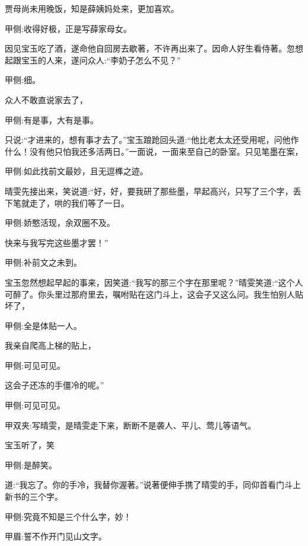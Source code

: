 \begin{parag}
    贾母尚未用晚饭，知是薛姨妈处来，更加喜欢。\begin{note}甲侧:收得好极，正是写薛家母女。\end{note}因见宝玉吃了酒，遂命他自回房去歇著，不许再出来了。因命人好生看侍著。忽想起跟宝玉的人来，遂问众人:“李奶子怎么不见？”\begin{note}甲侧:细。\end{note}众人不敢直说家去了，\begin{note}甲侧:有是事，大有是事。\end{note}只说:“才进来的，想有事才去了。”宝玉踉跄回头道:“他比老太太还受用呢，问他作什么！没有他只怕我还多活两日。”一面说，一面来至自己的卧室。只见笔墨在案，\begin{note}甲侧:如此找前文最妙，且无逗榫之迹。\end{note}晴雯先接出来，笑说道:“好，好，要我研了那些墨，早起高兴，只写了三个字，丢下笔就走了，哄的我们等了一日。\begin{note}甲侧:娇憨活现，余双圈不及。\end{note}快来与我写完这些墨才罢！”\begin{note}甲侧:补前文之未到。\end{note}宝玉忽然想起早起的事来，因笑道:“我写的那三个字在那里呢？”晴雯笑道:“这个人可醉了。你头里过那府里去，嘱咐贴在这门斗上，这会子又这么问。我生怕别人贴坏了，\begin{note}甲侧:全是体贴一人。\end{note}我亲自爬高上梯的贴上，\begin{note}甲侧:可见可见。\end{note}这会子还冻的手僵冷的呢。”\begin{note}甲侧:可见可见。\end{note}\begin{note}甲双夹:写晴雯，是晴雯走下来，断断不是袭人、平儿、莺儿等语气。\end{note}宝玉听了，笑\begin{note}甲侧:是醉笑。\end{note}道:“我忘了。你的手冷，我替你渥著。”说著便伸手携了晴雯的手，同仰首看门斗上新书的三个字。\begin{note}甲侧:究竟不知是三个什么字，妙！\end{note}\begin{note}甲眉:誓不作开门见山文字。\end{note}
\end{parag}


